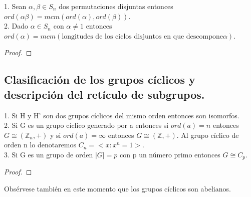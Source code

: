 \begin{proposition}
1. Sean $\alpha,\beta \in S_n$ dos permutaciones disjuntas entonces $ord(\alpha\beta) = mcm(ord(\alpha),ord(\beta))$.\\
2. Dado $\alpha \in S_n$ con $\alpha \neq 1$ entonces $ord(\alpha) = mcm(\text{longitudes de los ciclos disjuntos en que descompone} \alpha)$.
\end{proposition}
\begin{proof}

\end{proof}

\subsection{Clasificación de los grupos cíclicos y descripción del retículo de subgrupos.}

\begin{theorem}
1. Si H y H' son dos grupos cíclicos del mismo orden entonces son isomorfos.\\
2. Si G es un grupo cíclico generado por a entonces si $ord(a) = n$ entonces $G \cong (\mathbb{Z}_n,+)$ y si $ord(a) = \infty$ entonces $G \cong (\mathbb{Z},+)$. Al grupo cíclico de orden n lo denotaremos $C_n = <x:x^n = 1>$.\\
3. Si G es un grupo de orden $|G| = p$ con p un número primo entonces $G \cong C_p$.
\end{theorem}
\begin{proof}

\end{proof}

Obsérvese también en este momento que los grupos cíclicos son abelianos.

